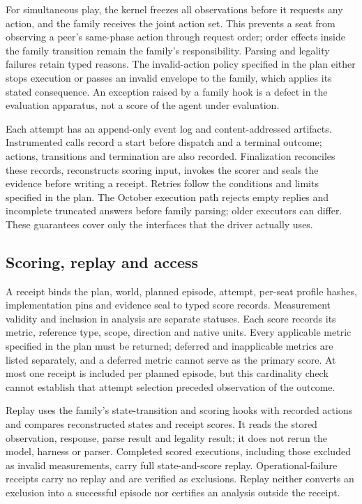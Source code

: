For simultaneous play, the kernel freezes all observations before it requests any
action, and the family receives the joint action set. This prevents a
seat from observing a peer's same-phase action through request order;
order effects inside the family transition remain the family's
responsibility. Parsing and legality failures retain typed reasons.
The invalid-action policy specified in the plan either stops execution or passes an
invalid envelope to the family, which applies its stated consequence. An exception raised by a family
hook is a defect in the evaluation apparatus, not a score of the agent under evaluation.

Each attempt has an append-only event log and content-addressed artifacts.
Instrumented calls record a start before dispatch and a terminal outcome;
actions, transitions and termination are also recorded. Finalization
reconciles these records, reconstructs scoring input, invokes the scorer
and seals the evidence before writing a receipt. Retries follow the
conditions and limits specified in the plan. The October execution path rejects empty replies and
incomplete truncated answers before family parsing; older executors can
differ. These guarantees cover only the interfaces that the driver actually uses.

\subsection{Scoring, replay and access}
\label{app:runtime-replay}

A receipt binds the plan, world, planned episode, attempt, per-seat profile
hashes, implementation pins and evidence seal to typed score records.
Measurement validity and inclusion in analysis are separate statuses.
Each score records its metric, reference type, scope, direction and native
units. Every applicable metric specified in the plan must be returned; deferred and
inapplicable metrics are listed separately, and a deferred metric cannot serve
as the primary score. At most one receipt is included per planned episode,
but this cardinality check cannot establish that attempt selection
preceded observation of the outcome.

Replay uses the family's state-transition and scoring hooks with recorded
actions and compares reconstructed states and receipt scores. It reads
the stored observation, response, parse result and legality result; it
does not rerun the model, harness or parser. Completed scored executions,
including those excluded as invalid measurements, carry full state-and-score replay.
Operational-failure receipts carry no replay and are
verified as exclusions. Replay neither converts an exclusion into a
successful episode nor certifies an analysis outside the receipt.

